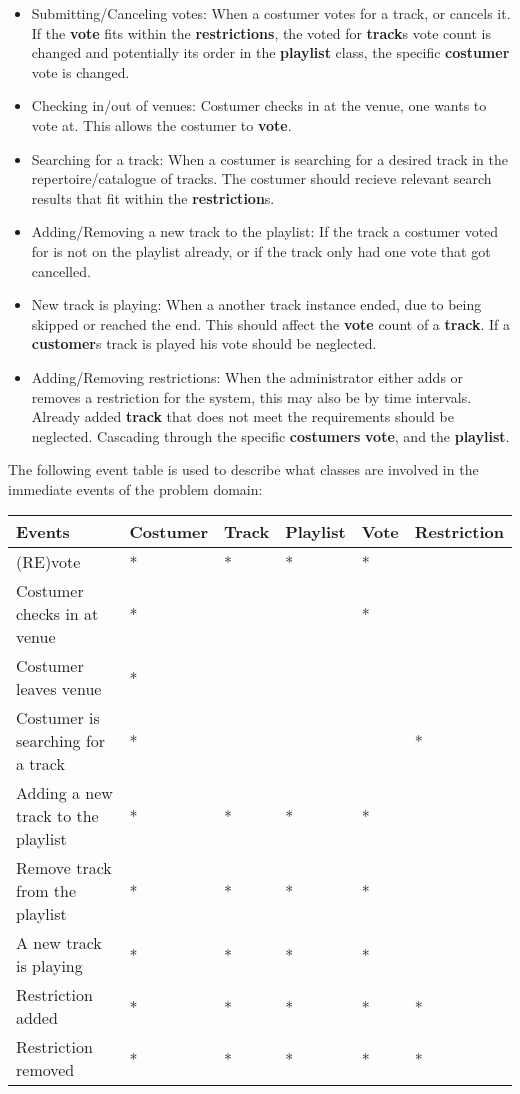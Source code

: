 \begin{itemize}
\item Submitting/Canceling votes:
    When a costumer votes for a track, or cancels it. If the \textbf{vote} fits within the \textbf{restrictions}, the voted for \textbf{track}s vote count is changed and potentially its order in the \textbf{playlist} class, the specific \textbf{costumer} vote is changed.
\item Checking in/out of venues:
    Costumer checks in at the venue, one wants to vote at. This allows the costumer to \textbf{vote}.
\item Searching for a track:
    When a costumer is searching for a desired track in the repertoire/catalogue of tracks. The costumer should recieve relevant search results that fit within the \textbf{restriction}s.
\item Adding/Removing a new track to the playlist:
    If the track a costumer voted for is not on the playlist already, or if the track only had one vote that got cancelled.
\item New track is playing:
    When a another track instance ended, due to being skipped or reached the end. This should affect the \textbf{vote} count of a \textbf{track}. If a \textbf{customer}s track is played his vote should be neglected.
\item Adding/Removing restrictions:
    When the administrator either adds or removes a restriction for the system, this may also be by time intervals. Already added \textbf{track} that does not meet the requirements should be neglected. Cascading through the specific \textbf{costumers} \textbf{vote}, and the \textbf{playlist}.
\end{itemize}

The following event table is used to describe what classes are involved in the immediate events of the problem domain:

\begin{center}
    \begin{tabular}{|l|l|l|l|l|l|}
    \hline
    \textbf{Events} & Costumer & Track & Playlist & Vote & Restriction \\ \hline
    (RE)vote & * & * & * & * &   \\ \hline
    Costumer checks in at venue & * &   &   & * &   \\ \hline
    Costumer leaves venue & * &   &   &   &   \\ \hline
    Costumer is searching for a track & * &   &   &  & * \\ \hline
    Adding a new track to the playlist & * & * & * & * &   \\ \hline
    Remove track from the playlist & * & * & * & * &   \\ \hline
    A new track is playing & * & * & * & * &   \\ \hline
    Restriction added & * & * & * & * & * \\ \hline
    Restriction removed & * & * & * & * & * \\ \hline
    \end{tabular}
\end{center}


